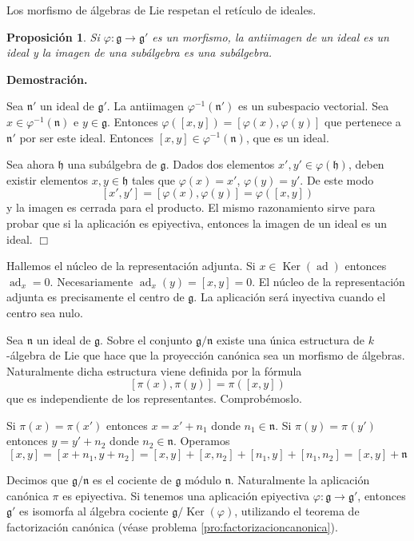 \documentclass[a4paper,draft,12pt]{scrartcl}
\newtheorem{propo}[teo]{Proposición}%
\newcommand{\dem}{\noindent \textbf{Demostración. }\vspace{0.3 cm}}%
\newcommand{\g}{\mathfrak{g}}%
\newcommand{\fin}{ $\Box $ \vspace{0.4 cm}}
\newcommand{\df}[1]{\textsf{\color{blue}#1}}
\DeclareMathOperator{\Ker}{Ker}%
\DeclareMathOperator{\ad}{ad}  %
\begin{document}
Los morfismo de álgebras de Lie respetan el retículo de ideales.




\begin{propo}
 Si $\varphi : \g \rightarrow   \g'$   es un morfismo, la antiimagen de un ideal es un ideal y la imagen de una subálgebra es una subálgebra.
 
\end{propo}

\dem


Sea $\mathfrak{n}'$ un ideal de $\g'$.  La antiimagen $\varphi^{-1}(\mathfrak{n}')$ es un subespacio vectorial.  Sea $x \in \varphi^{-1}(\mathfrak{n})$ e $y \in \g$.  Entonces $\varphi([x,y])= [\varphi(x), \varphi(y)]$ que pertenece a $\mathfrak{n}'$ por ser este ideal.  Entonces $[x,y] \in \varphi^{-1}(\mathfrak{n})$, que es un ideal.

\bigskip

Sea ahora $\mathfrak{h}$ una subálgebra de $\g$.  Dados dos elementos $x',y'\in \varphi(\mathfrak{h})$, deben existir elementos $x,y \in \mathfrak{h}$ tales que $\varphi(x)=x'$, $\varphi(y)=y'$.  De este modo 
$$
[x',y']= [\varphi(x),\varphi(y)] =\varphi([x,y])
$$
 y la imagen es cerrada para el producto.  El mismo razonamiento sirve para probar que si la aplicación es epiyectiva, entonces la imagen de un ideal es un ideal. \fin
 
 
 Hallemos el núcleo de la representación adjunta. Si $x \in \Ker(\ad)$ entonces $\ad_x=0$.  Necesariamente $\ad_x(y)= [x,y]=0$. El núcleo de la representación adjunta es precisamente el centro de $\g$.  La aplicación será inyectiva cuando el centro sea nulo.
 
 \bigskip


Sea  $\mathfrak{n}$  un ideal de $\g$. Sobre el conjunto $\g/\mathfrak{n}$ existe una única estructura de $k$-álgebra de Lie que hace que la proyección canónica   sea un morfismo de álgebras.
Naturalmente dicha estructura viene definida por la fórmula
$$
[\pi(x), \pi(y)] = \pi([x,y])
$$
que es independiente de los representantes. Comprobémoslo.

Si $\pi(x) = \pi(x')$ entonces $x= x'+n_1$ donde $n_1 \in \mathfrak{n}$. Si $\pi(y) = \pi(y')$ entonces $y= y'+n_2$ donde $n_2 \in \mathfrak{n}$. Operamos
$$
[x,y]= [x+n_1,y+n_2]= [x,y]+ [x,n_2]+[n_1,y] +[n_1,n_2] = [x,y]+ \mathfrak{n}
$$

Decimos que $\g/\mathfrak{n}$ es el  \df{cociente}  de $\g$ módulo $\mathfrak{n}$. Naturalmente la aplicación canónica $\pi$ es epiyectiva.  Si tenemos una aplicación epiyectiva $\varphi: \g \rightarrow \g'$, entonces $\g'$ es isomorfa al álgebra cociente $\g/\Ker(\varphi)$, utilizando el teorema de factorización canónica (véase problema \ref{pro:factorizacioncanonica}).
\end{document}
